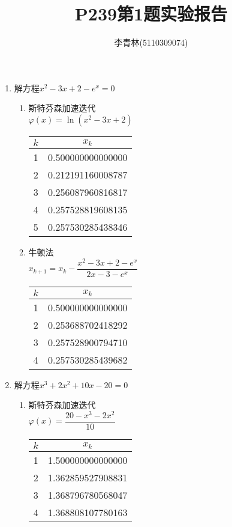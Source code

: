 \documentclass[12pt]{article}
\date{}
\title{P239第1题实验报告}
\author{李青林(5110309074)}
\begin{document}
\maketitle

\begin{enumerate}
\item
解方程$x^2-3x+2-e^x=0$\\
\begin{enumerate}
\item 斯特芬森加速迭代\\
$\varphi(x)=\ln(x^2-3x+2)$\\
\begin{tabular}{|c|c|}
\hline 
$k$ & $x_k$ \\ 
\hline
1 & 0.500000000000000 \\
\hline 
2 &   0.212191160008787  \\ 
\hline 
3 &   0.256087960816817   \\ 
\hline 
4 &  0.257528819608135   \\ 
\hline 
5 & 0.257530285438346 \\ 
\hline 
\end{tabular} 

\item 牛顿法\\
$x_{k+1}=x_k-\dfrac{x^2-3x+2-e^x}{2x-3-e^x}$\\
\begin{tabular}{|c|c|}
\hline 
$k$ & $x_k$ \\ 
\hline 
1 & 0.500000000000000 \\ 
\hline 
2 & 0.253688702418292 \\ 
\hline 
3 & 0.257528900794710 \\ 
\hline 
4 & 0.257530285439682 \\ 
\hline 
\end{tabular} 

\end{enumerate}

\item
解方程$x^3+2x^2+10x-20=0$\\
\begin{enumerate}
\item 斯特芬森加速迭代\\
$\varphi(x)=\dfrac{20-x^3-2x^2}{10}$\\
\begin{tabular}{|c|c|}
\hline 
$k$ & $x_k$ \\ 
\hline
1 &    1.500000000000000\\
\hline 
2 &     1.362859527908831 \\ 
\hline 
3 &     1.368796780568047    \\ 
\hline 
4 &   1.368808107780163 \\ 
\hline 
\end{tabular} 


\end{enumerate}
\end{enumerate}
\end{document}
